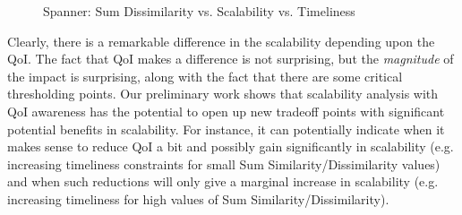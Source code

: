 \begin{figure}
   \caption{Spanner:  Sum Dissimilarity vs. Scalability vs. Timeliness}
      \label{fig:3dplots34}
\end{figure}

Clearly, there is a remarkable difference in the scalability depending upon
the QoI. 
The fact that QoI makes a difference is not surprising, but the {\em magnitude} of the
impact is surprising, along with the fact that there are some critical
thresholding points. Our preliminary work shows that
scalability analysis with QoI awareness has the potential to
open up new tradeoff points with
significant potential benefits in scalability. For instance, it can
potentially indicate when it makes sense to reduce QoI a bit and possibly
gain significantly in scalability (e.g. increasing timeliness constraints for small Sum Similarity/Dissimilarity values)
and when such reductions will only give a marginal
increase in scalability
(e.g. increasing timeliness for high values of Sum Similarity/Dissimilarity).



